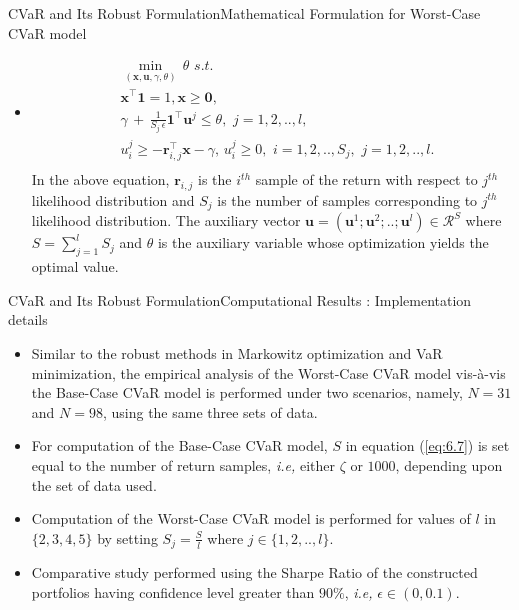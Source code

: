 \documentclass{beamer}
\begin{document}
\begin{frame}{CVaR and Its Robust Formulation}{Mathematical Formulation for Worst-Case CVaR model}
\begin{itemize}
    \item{ 
    \begin{equation}
\label{eq:6.11}
\begin{split}
& \min_{(\mathbf{x},\mathbf{u},\gamma,\theta)} \, \theta \, \, s.t. \\
& \mathbf{x}^{\top}\mathbf{1}=1, \mathbf{x} \geq \mathbf{0}, \\
& \gamma \, + \, \frac{1}{S_{j} \, \epsilon} \mathbf{1}^{\top}\mathbf{u}^{j} \leq \theta, \, \, j=1,2,..,l,\\
& u_{i}^{j} \geq -\mathbf{r}_{i,j}^{\top}\mathbf{x}-\gamma, \, u_{i}^{j} \geq 0, \, \, i=1,2,..,S_{j}, \, \, j=1,2,..,l. \\
\end{split}
\end{equation}
In the above equation, $\mathbf{r}_{i,j}$ is the $i^{th}$ sample of the return with respect to $j^{th}$ likelihood distribution and $S_{j}$ is the number of samples corresponding to $j^{th}$ likelihood distribution. The auxiliary vector $\mathbf{u}=(\mathbf{u}^{1} ; \mathbf{u}^{2} ; .. ; \mathbf{u}^{l}) \in \mathcal{R}^{S}$ where $\displaystyle{S=\sum_{j=1}^{l}S_{j}}$ and $\theta$ is the auxiliary variable whose optimization yields the optimal value.}
\end{itemize}
\end{frame}

\begin{frame}{CVaR and Its Robust Formulation}{Computational Results : Implementation details}
\begin{itemize}
    \item{Similar to the robust methods in Markowitz optimization and VaR minimization, the empirical analysis of the Worst-Case CVaR  model vis-\`a-vis the Base-Case CVaR model is performed under two scenarios, namely, $N=31$ and $N=98$, using the same three sets of data.}
    \item{For computation of the Base-Case CVaR model, $S$ in equation (\ref{eq:6.7}) is set equal to the number of return samples, \textit{i.e,} either $\zeta$ or $1000$, depending upon the set of data used.}
    \item{Computation of the Worst-Case CVaR model is performed for values of $l$ in $\{2,3,4,5\}$ by setting $\displaystyle{S_{j}=\frac{S}{l}}$ where $\displaystyle{j \in \{1,2,..,l \}}$.}
    \item{Comparative study performed using the Sharpe Ratio of the constructed portfolios having confidence level greater than $90\%$, \textit{i.e,} $\epsilon \in (0,0.1)$.}
\end{itemize}
\end{frame}
\end{document}
